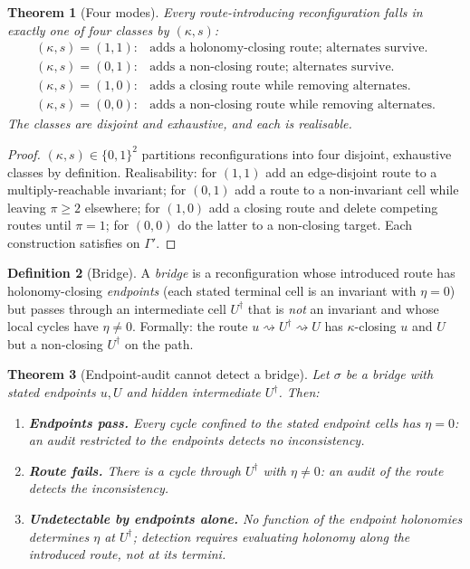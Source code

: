 \documentclass[11pt,a4paper]{article}
\theoremstyle{thmstyle}
\newtheorem{theorem}{Theorem}[section]
\theoremstyle{definition}
\newtheorem{definition}[theorem]{Definition}
\theoremstyle{remark}
\newcommand{\Gph}{\Gamma}
\newcommand{\hol}{\eta}            %
\newcommand{\reshuffle}{\sigma}    %
\begin{document}
\begin{theorem}[Four modes]
\label{thm:fourmodes}
Every route-introducing reconfiguration falls in exactly one of four classes
by $(\kappa,s)$:
\[
\begin{array}{ll}
(\kappa,s)=(1,1): & \text{adds a holonomy-closing route; alternates survive.}\\
(\kappa,s)=(0,1): & \text{adds a non-closing route; alternates survive.}\\
(\kappa,s)=(1,0): & \text{adds a closing route while removing alternates.}\\
(\kappa,s)=(0,0): & \text{adds a non-closing route while removing alternates.}
\end{array}
\]
The classes are disjoint and exhaustive, and each is realisable.
\end{theorem}

\begin{proof}
$(\kappa,s)\in\{0,1\}^2$ partitions reconfigurations into four disjoint,
exhaustive classes by definition. Realisability: for $(1,1)$ add an
edge-disjoint route to a multiply-reachable invariant; for $(0,1)$ add a
route to a non-invariant cell while leaving $\pi\ge2$ elsewhere; for $(1,0)$
add a closing route and delete competing routes until $\pi=1$; for $(0,0)$
do the latter to a non-closing target. Each construction satisfies
 on $\Gph'$.
\end{proof}

\begin{definition}[Bridge]
\label{def:bridge}
A \emph{bridge} is a reconfiguration whose introduced route has
holonomy-closing \emph{endpoints} (each stated terminal cell is an invariant
with $\hol=0$) but passes through an intermediate cell $U^\dagger$ that is
\emph{not} an invariant and whose local cycles have $\hol\neq0$. Formally:
the route $u\rightsquigarrow U^\dagger\rightsquigarrow U$ has
$\kappa$-closing $u$ and $U$ but a non-closing $U^\dagger$ on the path.
\end{definition}

\begin{theorem}[Endpoint-audit cannot detect a bridge]
\label{thm:bridge}
Let $\reshuffle$ be a bridge with stated endpoints $u,U$ and hidden
intermediate $U^\dagger$. Then:
\begin{enumerate}[label=\textup{(\roman*)},leftmargin=2.2em]
\item \textbf{Endpoints pass.} Every cycle confined to the stated endpoint
cells has $\hol=0$: an audit restricted to the endpoints detects no
inconsistency.
\item \textbf{Route fails.} There is a cycle through $U^\dagger$ with
$\hol\neq0$: an audit of the route detects the inconsistency.
\item \textbf{Undetectable by endpoints alone.} No function of the endpoint
holonomies determines $\hol$ at $U^\dagger$; detection requires evaluating
holonomy along the introduced route, not at its termini.
\end{enumerate}
\end{theorem}
\end{document}
